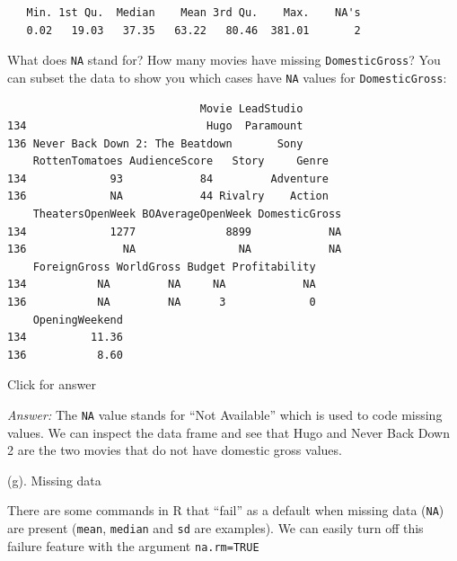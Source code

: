\documentclass[
]{book}
\newenvironment{Shaded}{\begin{snugshade}}{\end{snugshade}}
\newcommand{\AttributeTok}[1]{\textcolor[rgb]{0.77,0.63,0.00}{#1}}
\newcommand{\ConstantTok}[1]{\textcolor[rgb]{0.00,0.00,0.00}{#1}}
\newcommand{\FunctionTok}[1]{\textcolor[rgb]{0.00,0.00,0.00}{#1}}
\newcommand{\NormalTok}[1]{#1}
\newcommand{\SpecialCharTok}[1]{\textcolor[rgb]{0.00,0.00,0.00}{#1}}
\begin{document}
\begin{verbatim}
   Min. 1st Qu.  Median    Mean 3rd Qu.    Max.    NA's 
   0.02   19.03   37.35   63.22   80.46  381.01       2 
\end{verbatim}

What does \texttt{NA} stand for? How many movies have missing \texttt{DomesticGross}? You can subset the data to show you which cases have \texttt{NA} values for \texttt{DomesticGross}:

\begin{Shaded}
\end{Shaded}

\begin{verbatim}
                              Movie LeadStudio
134                            Hugo  Paramount
136 Never Back Down 2: The Beatdown       Sony
    RottenTomatoes AudienceScore   Story     Genre
134             93            84         Adventure
136             NA            44 Rivalry    Action
    TheatersOpenWeek BOAverageOpenWeek DomesticGross
134             1277              8899            NA
136               NA                NA            NA
    ForeignGross WorldGross Budget Profitability
134           NA         NA     NA            NA
136           NA         NA      3             0
    OpeningWeekend
134          11.36
136           8.60
\end{verbatim}

Click for answer

\emph{Answer:} The \texttt{NA} value stands for ``Not Available'' which is used to code missing values. We can inspect the data frame and see that Hugo and Never Back Down 2 are the two movies that do not have domestic
gross values.

(g). Missing data

There are some commands in R that ``fail'' as a default when missing data (\texttt{NA}) are present (\texttt{mean}, \texttt{median} and \texttt{sd} are examples). We can easily turn off this failure feature with the argument \texttt{na.rm=TRUE}

\begin{Shaded}
\end{Shaded}
\end{document}

